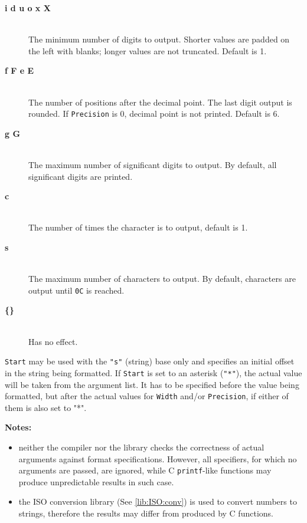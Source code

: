 \begin{description}
\item[{\bf i d u o x X}] \mbox{} \\
    The minimum number of digits to output. Shorter values are padded on
    the left with blanks; longer values are not truncated. Default is 1.
\item[{\bf f F e E}] \mbox{} \\
    The number of positions after the decimal point. The last digit output
    is rounded. If {\tt Precision} is 0, decimal point is not printed.
    Default is 6.
\item[{\bf g G}] \mbox{} \\
    The maximum number of significant digits to output. By default,
    all significant digits are printed.
\item[{\bf c}] \mbox{} \\
    The number of times the character is to output, default is 1.
\item[{\bf s}] \mbox{} \\
    The maximum number of characters to output. By default, characters
    are output until \verb'0C' is reached.
\item[{\bf \{\}}] \mbox{} \\
    Has no effect.
\end{description}

{\tt Start} may be used with the \verb'"s"' (string) base only
and specifies an initial offset in the string being formatted.
If {\tt Start} is set to an asterisk (\verb'"*"'), the actual value will
be taken from the argument list. It has to be specified before the value being
formatted, but after the actual values for {\tt Width} and/or {\tt Precision},
if either of them is also set to "*".

{\bf Notes:}

\begin{itemize}
\item  neither the compiler nor the library checks the correctness
       of actual arguments against format specifications.
       However, all specifiers, for which no arguments are passed,
       are ignored, while C {\tt printf}-like functions may
       produce unpredictable results in such case.
\item  the ISO conversion library (See \ref{lib:ISO:conv})
       is used to convert numbers to strings, therefore the results may
       differ from produced by C functions.
\end{itemize}

